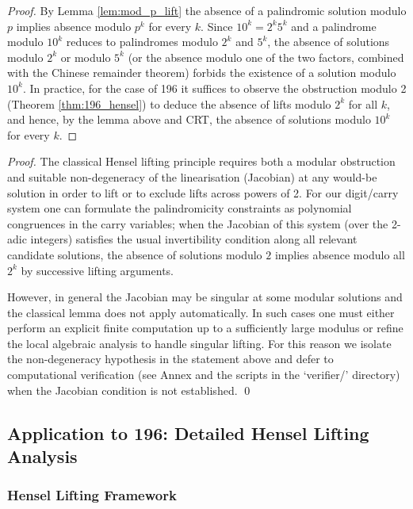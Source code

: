 \documentclass[12pt,a4paper]{article}
\begin{document}
\begin{proof}
By Lemma \ref{lem:mod_p_lift} the absence of a palindromic solution modulo $p$ implies absence modulo $p^k$ for every $k$. Since $10^k=2^k5^k$ and a palindrome modulo $10^k$ reduces to palindromes modulo $2^k$ and $5^k$, the absence of solutions modulo $2^k$ or modulo $5^k$ (or the absence modulo one of the two factors, combined with the Chinese remainder theorem) forbids the existence of a solution modulo $10^k$. In practice, for the case of 196 it suffices to observe the obstruction modulo 2 (Theorem \ref{thm:196_hensel}) to deduce the absence of lifts modulo $2^k$ for all $k$, and hence, by the lemma above and CRT, the absence of solutions modulo $10^k$ for every $k$.
\end{proof}

\begin{proof}
The classical Hensel lifting principle requires both a modular obstruction and suitable non-degeneracy of the linearisation (Jacobian) at any would-be solution in order to lift or to exclude lifts across powers of 2. For our digit/carry system one can formulate the palindromicity constraints as polynomial congruences in the carry variables; when the Jacobian of this system (over the 2-adic integers) satisfies the usual invertibility condition along all relevant candidate solutions, the absence of solutions modulo $2$ implies absence modulo all $2^k$ by successive lifting arguments.

However, in general the Jacobian may be singular at some modular solutions and the classical lemma does not apply automatically. In such cases one must either perform an explicit finite computation up to a sufficiently large modulus or refine the local algebraic analysis to handle singular lifting. For this reason we isolate the non-degeneracy hypothesis in the statement above and defer to computational verification (see Annex and the scripts in the `verifier/' directory) when the Jacobian condition is not established.
\qed
\end{proof}

\subsection{Application to 196: Detailed Hensel Lifting Analysis}

\subsubsection{Hensel Lifting Framework}
\end{document}
